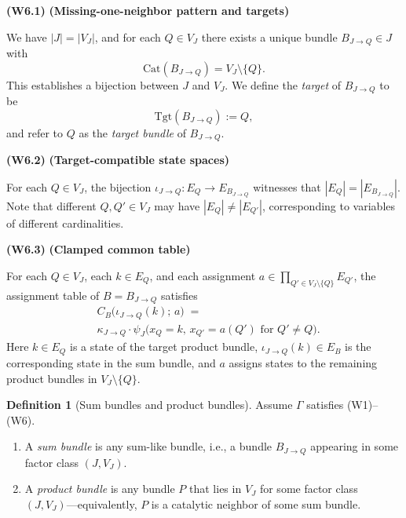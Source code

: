 \documentclass{article}
\theoremstyle{plain}
\theoremstyle{definition}
\newtheorem{definition}[theorem]{Definition}
\theoremstyle{remark}
\newcommand{\Cat}{\textrm{Cat}}
\newcommand{\<}{\langle}
\newcommand{\tgt}{\textrm{Tgt}}
\renewcommand{\>}{\rangle}
\begin{document}
\textbf{(W6.1)} \textbf{(Missing-one-neighbor pattern and targets)}
    
    We have $|J| = |V_J|$, and for each $Q \in V_J$ there exists a unique bundle 
    $B_{J \to Q} \in J$ with
    \[
        \Cat(B_{J \to Q}) = V_J \setminus \{Q\}.
    \]
    This establishes a bijection between $J$ and $V_J$. We define the \emph{target} 
    of $B_{J \to Q}$ to be
    \[
        \tgt(B_{J \to Q}) := Q,
    \]
    and refer to $Q$ as the \emph{target bundle} of $B_{J \to Q}$.
    
\textbf{(W6.2)} \textbf{(Target-compatible state spaces)}
    
    For each $Q \in V_J$, the bijection $\iota_{J \to Q} : E_Q \to E_{B_{J \to Q}}$ 
    witnesses that $|E_Q| = |E_{B_{J \to Q}}|$. Note that different $Q, Q' \in V_J$ 
    may have $|E_Q| \neq |E_{Q'}|$, corresponding to variables of different cardinalities.
    
\textbf{(W6.3)} \textbf{(Clamped common table)}
    
    For each $Q \in V_J$, each $k \in E_Q$, and each assignment 
    $a \in \prod_{Q' \in V_J \setminus \{Q\}} E_{Q'}$, the assignment table of 
    $B = B_{J \to Q}$ satisfies
    \begin{align*}
       &C_{B}\bigl(\iota_{J \to Q}(k);\, a\bigr) 
        \;=\; \\&\kappa_{J \to Q} \cdot 
        \psi_J\bigl(x_Q = k,\, x_{Q'} = a(Q') \text{ for } Q' \neq Q\bigr).
    \end{align*}
    Here $k \in E_Q$ is a state of the target product bundle, 
    $\iota_{J \to Q}(k) \in E_B$ is the corresponding state in the sum bundle, 
    and $a$ assigns states to the remaining product bundles in $V_J \setminus \{Q\}$.

\begin{definition}[Sum bundles and product bundles]\label{def:sum-product-bundles}
Assume $\Gamma$ satisfies (W1)--(W6).
\begin{enumerate}
    \item A \emph{sum bundle} is any sum-like bundle, i.e., a bundle $B_{J \to Q}$ 
          appearing in some factor class $(J, V_J)$.
    \item A \emph{product bundle} is any bundle $P$ that lies in $V_J$ for some 
          factor class $(J, V_J)$---equivalently, $P$ is a catalytic neighbor 
          of some sum bundle.
\end{enumerate}
\end{definition}
\end{document}
